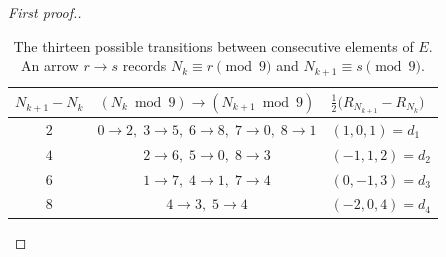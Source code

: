 \documentclass[12pt,reqno]{article}
\begin{document}
\begin{proof}[First proof.]
\begin{table}[ht]
\centering
\renewcommand{\arraystretch}{1.2}
\begin{tabular}{ccl}
\hline
$N_{k+1}-N_k$
&
$(N_k\bmod 9)\longrightarrow (N_{k+1}\bmod 9)$
&
$\frac12\bigl(R_{N_{k+1}}-R_{N_k}\bigr)$
\\
\hline
$2$
&
$0\to2,\;3\to5,\;6\to8,\;7\to0,\;8\to1$
&
$(1,0,1)=d_1$
\\
$4$
&
$2\to6,\;5\to0,\;8\to3$
&
$(-1,1,2)=d_2$
\\
$6$
&
$1\to7,\;4\to1,\;7\to4$
&
$(0,-1,3)=d_3$
\\
$8$
&
$4\to3,\;5\to4$
&
$(-2,0,4)=d_4$
\\
\hline
\end{tabular}
\caption{The thirteen possible transitions between consecutive
elements of \(E\). An arrow \(r\to s\) records
\(N_k\equiv r\pmod 9\) and \(N_{k+1}\equiv s\pmod 9\).}
\label{tab:return-transitions}
\end{table} \qedhere
\end{proof}
\end{document}
